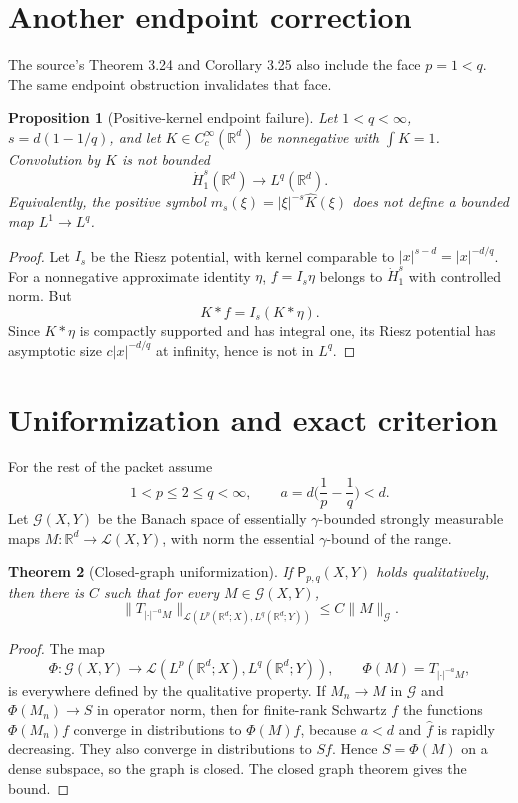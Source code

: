 \documentclass[11pt]{article}
\newtheorem{theorem}{Theorem}[section]
\newtheorem{proposition}[theorem]{Proposition}
\newcommand{\R}{\mathbb R}
\newcommand{\cL}{\mathcal L}
\newcommand{\Gcal}{\mathcal G}
\newcommand{\Pprop}{\mathsf P}
\newcommand{\gam}{\gamma}
\newcommand{\norm}[1]{\lVert #1\rVert}
\newcommand{\abs}[1]{\lvert #1\rvert}
\begin{document}
\section{Another endpoint correction}

The source's Theorem 3.24 and Corollary 3.25 also include the face \(p=1<q\).
The same endpoint obstruction invalidates that face.

\begin{proposition}[Positive-kernel endpoint failure]\label{prop:positivekernel}
Let \(1<q<\infty\), \(s=d(1-1/q)\), and let \(K\in C_c^\infty(\R^d)\) be
nonnegative with \(\int K=1\).  Convolution by \(K\) is not bounded
\[
  \dot H^s_1(\R^d)\to L^q(\R^d).
\]
Equivalently, the positive symbol \(m_s(\xi)=\abs{\xi}^{-s}\widehat K(\xi)\)
does not define a bounded map \(L^1\to L^q\).
\end{proposition}

\begin{proof}
Let \(I_s\) be the Riesz potential, with kernel comparable to
\(\abs{x}^{s-d}=\abs{x}^{-d/q}\).  For a nonnegative approximate identity
\(\eta\), \(f=I_s\eta\) belongs to \(\dot H^s_1\) with controlled norm.  But
\[
  K*f=I_s(K*\eta).
\]
Since \(K*\eta\) is compactly supported and has integral one, its Riesz
potential has asymptotic size \(c\abs{x}^{-d/q}\) at infinity, hence is not in
\(L^q\).
\end{proof}

\section{Uniformization and exact criterion}

For the rest of the packet assume
\[
  1<p\le2\le q<\infty,\qquad a=d\Big(\frac1p-\frac1q\Big)<d.
\]
Let \(\Gcal(X,Y)\) be the Banach space of essentially \(\gam\)-bounded
strongly measurable maps \(M:\R^d\to\cL(X,Y)\), with norm the essential
\(\gam\)-bound of the range.

\begin{theorem}[Closed-graph uniformization]\label{thm:uniformization}
If \(\Pprop_{p,q}(X,Y)\) holds qualitatively, then there is \(C\) such that
for every \(M\in\Gcal(X,Y)\),
\[
  \norm{T_{\abs{\cdot}^{-a}M}}_{\cL(L^p(\R^d;X),L^q(\R^d;Y))}
  \le C\norm{M}_{\Gcal}.
\]
\end{theorem}

\begin{proof}
The map
\[
  \Phi:\Gcal(X,Y)\to\cL(L^p(\R^d;X),L^q(\R^d;Y)),\qquad
  \Phi(M)=T_{\abs{\cdot}^{-a}M},
\]
is everywhere defined by the qualitative property.  If \(M_n\to M\) in
\(\Gcal\) and \(\Phi(M_n)\to S\) in operator norm, then for finite-rank
Schwartz \(f\) the functions \(\Phi(M_n)f\) converge in distributions to
\(\Phi(M)f\), because \(a<d\) and \(\widehat f\) is rapidly decreasing.  They
also converge in distributions to \(Sf\).  Hence \(S=\Phi(M)\) on a dense
subspace, so the graph is closed.  The closed graph theorem gives the bound.
\end{proof}
\end{document}
